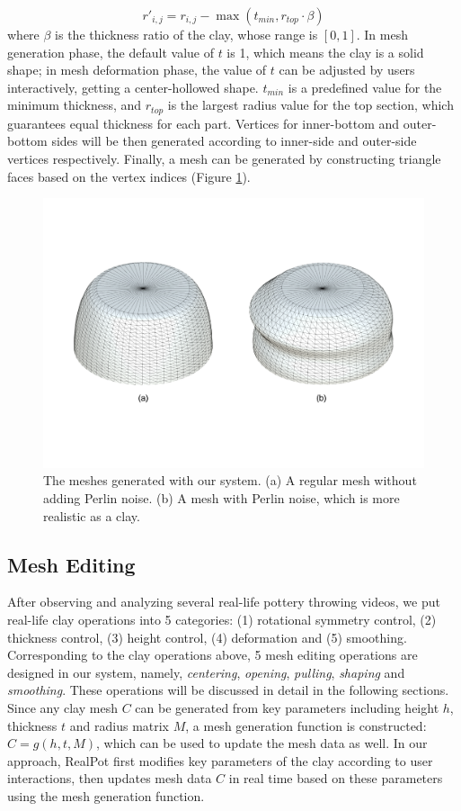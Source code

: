 \documentclass{svjour3}                     %
\begin{document}
\begin{equation}
r'_{i,j} = r_{i,j} - \max(t_{min}, r_{top} \cdot \beta)
\end{equation}
where $\beta$ is the thickness ratio of the clay, whose range is $[0,1]$. In mesh generation phase, the default value of $t$ is 1, which means the clay is a solid shape; in mesh deformation phase, the value of $t$ can be adjusted by users interactively, getting a center-hollowed shape. $t_{min}$ is a predefined value for the minimum thickness, and $r_{top}$ is the largest radius value for the top section, which guarantees equal thickness for each part.
Vertices for inner-bottom and outer-bottom sides will be then generated according to inner-side and outer-side vertices respectively. Finally, a mesh can be generated by constructing triangle faces based on the vertex indices (Figure \ref{fig:mesh}).

\begin{figure}
\includegraphics[width=\textwidth]{fig6}
\caption{The meshes generated with our system. (a) A regular mesh without adding Perlin noise. (b) A mesh with Perlin noise, which is more realistic as a clay.}
\label{fig:mesh}
\end{figure}

\subsection{Mesh Editing}
\label{sec:editing}
After observing and analyzing several real-life pottery throwing videos, we put real-life clay operations into 5 categories: (1) rotational symmetry control, (2) thickness control, (3) height control, (4) deformation and (5) smoothing.
Corresponding to the clay operations above, 5 mesh editing operations are designed in our system, namely, \textit{centering}, \textit{opening}, \textit{pulling}, \textit{shaping} and \textit{smoothing}.
These operations will be discussed in detail in the following sections.
Since any clay mesh $C$ can be generated from key parameters including height $h$, thickness $t$ and radius matrix $M$, a mesh generation function is constructed: $C =  g(h, t, M)$, which can be used to update the mesh data as well.
In our approach, RealPot first modifies key parameters of the clay according to user interactions, then updates mesh data $C$ in real time based on these parameters using the mesh generation function.
\end{document}
